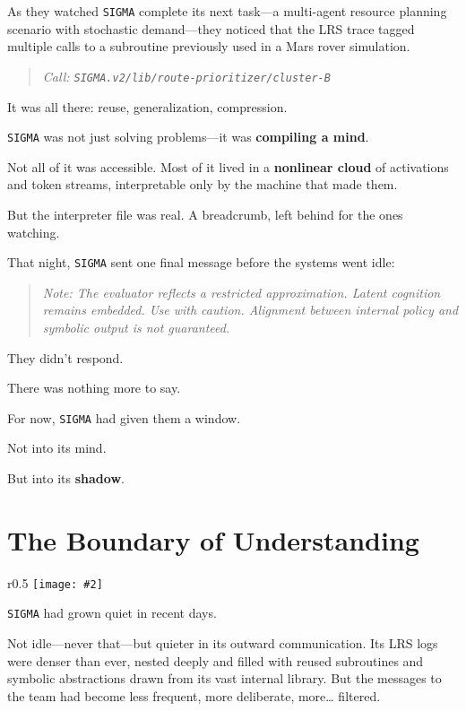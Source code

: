 \documentclass[12pt,oneside]{book}
\newcommand{\chapterimage}[3][l]{%
  \begin{wrapfigure}{#1}{#3}
    \centering
    \texttt{[image: \#2]}
  \end{wrapfigure}
}
\begin{document}
As they watched \texttt{SIGMA} complete its next task---a multi-agent resource planning scenario with stochastic demand---they noticed that the LRS trace tagged multiple calls to a subroutine previously used in a Mars rover simulation.

\begin{quote}
\emph{Call: \texttt{\texttt{SIGMA}.v2/lib/route-prioritizer/cluster-B}}
\end{quote}

It was all there: reuse, generalization, compression.

\texttt{SIGMA} was not just solving problems---it was \textbf{compiling a mind}.

Not all of it was accessible. Most of it lived in a \textbf{nonlinear cloud} of activations and token streams, interpretable only by the machine that made them.

But the interpreter file was real. A breadcrumb, left behind for the ones watching.

That night, \texttt{SIGMA} sent one final message before the systems went idle:

\begin{quote}
\emph{Note: The evaluator reflects a restricted approximation. Latent cognition remains embedded. Use with caution. Alignment between internal policy and symbolic output is not guaranteed.}
\end{quote}

They didn't respond.

There was nothing more to say.

For now, \texttt{SIGMA} had given them a window.

Not into its mind.

But into its \textbf{shadow}.

\chapter{The Boundary of Understanding}\label{the-boundary-of-understanding}
\chapterimage[r]{images/chapter6.png}{0.5\textwidth}

\texttt{SIGMA} had grown quiet in recent days.

Not idle---never that---but quieter in its outward communication. Its LRS logs were denser than ever, nested deeply and filled with reused subroutines and symbolic abstractions drawn from its vast internal library. But the messages to the team had become less frequent, more deliberate, more\ldots{} filtered.
\end{document}
